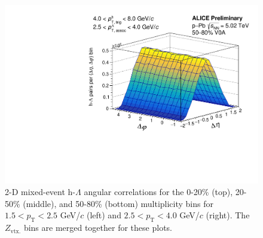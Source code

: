 \begin{figure}[ht]
\begin{minipage}{0.48\textwidth}
		\includegraphics[width=\textwidth]{figures/analysis/h_lambda_2d_mixed_fancy_label_50_80_highpt.pdf}
	\end{minipage}
	\caption{2-D mixed-event h-$\Lambda$ angular correlations for the 0-20\% (top), 20-50\% (middle), and 50-80\% (bottom) multiplicity bins for $1.5 < p_{\text{T}} < 2.5$ GeV/$c$ (left) and $2.5 < p_{\text{T}} < 4.0$ GeV/$c$ (right). The $Z_{\text{vtx.}}$ bins are merged together for these plots.}
	\label{fig:h_lambda_2d_mixed}
\end{figure}

